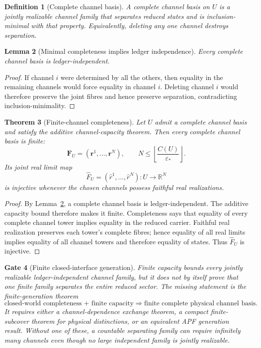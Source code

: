 \documentclass[11pt]{article}
\newtheorem{theorem}{Theorem}[section]
\newtheorem{lemma}[theorem]{Lemma}
\newtheorem{definition}[theorem]{Definition}
\newtheorem{gate}[theorem]{Gate}
\theoremstyle{remark}
\begin{document}
\begin{definition}[Complete channel basis]
\label{def:complete-channel-basis}
A \emph{complete channel basis} on $U$ is a jointly realizable channel family
that separates reduced states and is inclusion-minimal with that property.
Equivalently, deleting any one channel destroys separation.
\end{definition}

\begin{lemma}[Minimal completeness implies ledger independence]
\label{lem:minimal-complete-independent}
Every complete channel basis is ledger-independent.
\end{lemma}

\begin{proof}
If channel $i$ were determined by all the others, then equality in the
remaining channels would force equality in channel $i$.  Deleting channel $i$
would therefore preserve the joint fibres and hence preserve separation,
contradicting inclusion-minimality.
\end{proof}

\begin{theorem}[Finite-channel completeness]
\label{thm:finite-channel-completeness}
Let $U$ admit a complete channel basis and satisfy the additive
channel-capacity theorem.  Then every complete channel basis is finite:
\[
        \mathbf F_U=(\mathbf r^1,\ldots,\mathbf r^N),
        \qquad
        N\le\left\lfloor\frac{C(U)}{\varepsilon_*}\right\rfloor.
\]
Its joint real limit map
\[
        \widehat F_U=(\widehat r^1,\ldots,\widehat r^N):U\to\mathbb R^N
\]
is injective whenever the chosen channels possess faithful real realizations.
\end{theorem}

\begin{proof}
By Lemma~\ref{lem:minimal-complete-independent}, a complete channel basis is
ledger-independent.  The additive capacity bound therefore makes it finite.
Completeness says that equality of every complete channel tower implies equality
in the reduced carrier.  Faithful real realization preserves each tower's complete fibres; hence equality of all real limits implies equality of all channel towers and therefore equality of states.  Thus $\widehat F_U$ is injective.
\end{proof}

\begin{gate}[Finite closed-interface generation]
\label{gate:finite-closed-interface-generation}
Finite capacity bounds every jointly realizable ledger-independent channel
family, but it does not by itself prove that one finite family separates the
entire reduced sector. The missing statement is the finite-generation theorem
\[
\boxed{\text{closed-world completeness + finite capacity}
\Longrightarrow\text{finite complete physical channel basis}.}
\]
It requires either a channel-dependence exchange theorem, a compact finite-subcover
theorem for physical distinctions, or an equivalent APF generation result.
Without one of these, a countable separating family can require infinitely many
channels even though no large independent family is jointly realizable.
\end{gate}
\end{document}
